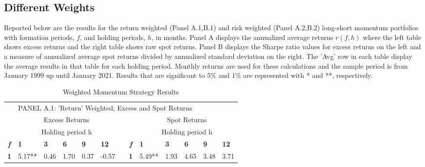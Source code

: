 \documentclass{article}
\begin{document}
\subsection{Different Weights}

\begin{table}[htbp!]
  \centering
  \vspace{-3cm}
  \caption{Weighted Momentum Strategy Results}
Reported below are the results for the return weighted (Panel A.1,B.1) and risk weighted (Panel A.2,B.2) long-short momentum portfolios with formation periods, $f$, and holding periods, $h$, in months. Panel A displays the annualized average returns $r(f,h)$ where the left table shows excess returns and the right table shows raw spot returns. Panel B displays the Sharpe ratio values for excess returns on the left and a measure of annualized average spot returns divided by annualized standard deviation on the right. The 'Avg' row in each table display the average results in that table for each holding period. Monthly returns are used for these calculations and the sample period is from January 1999 up until January 2021. Results that are significant to 5\% and 1\% are represented with * and **, respectively.
  \begin{adjustwidth}{-2cm}{}
    \begin{tabular}{ccccccccccccc}
          &       &       &       &       &       &       &       &       &       &       &       &  \\
    \midrule
          & \multicolumn{12}{l}{PANEL A.1: 'Return' Weighted; Excess and Spot Returns} \\
    \midrule
          & \multicolumn{5}{c}{Excess Returns}    &       &       & \multicolumn{5}{c}{Spot Returns} \\
\cmidrule{2-6}\cmidrule{9-13}          & \multicolumn{5}{c}{Holding period h}  &       &       & \multicolumn{5}{c}{Holding period h} \\
    \textit{\textbf{f}} & \multicolumn{1}{l}{\textbf{1}} & \multicolumn{1}{l}{\textbf{3}} & \multicolumn{1}{l}{\textbf{6}} & \multicolumn{1}{l}{\textbf{9}} & \multicolumn{1}{l}{\textbf{12}} &       & \textit{\textbf{f}} & \multicolumn{1}{l}{\textbf{1}} & \multicolumn{1}{l}{\textbf{3}} & \multicolumn{1}{l}{\textbf{6}} & \multicolumn{1}{l}{\textbf{9}} & \multicolumn{1}{l}{\textbf{12}} \\
\cmidrule{2-6}\cmidrule{9-13}    \textbf{1} & \multicolumn{1}{l}{5.17**} & \multicolumn{1}{l}{0.46} & \multicolumn{1}{l}{1.70} & \multicolumn{1}{l}{0.37} & \multicolumn{1}{l}{-0.57} &       & \textbf{1} & \multicolumn{1}{l}{5.49**} & \multicolumn{1}{l}{1.93} & \multicolumn{1}{l}{4.65} & \multicolumn{1}{l}{3.48} & \multicolumn{1}{l}{3.71} \\

\end{tabular}
\end{adjustwidth}
\end{table}
\end{document}
